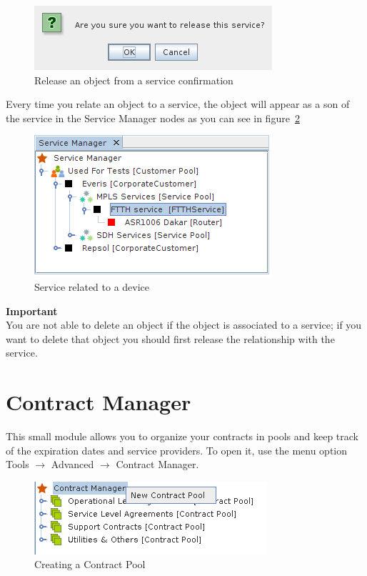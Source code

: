 \documentclass[a4paper]{article}
\begin{document}
	\begin{figure}[h!]
		\centering
		\includegraphics[width=0.5\linewidth]{img/sm_release_from_service_confrimation.png}
		\caption{Release an object from a service confirmation}
		\label{fig:sm_release_from_service_confirmation}
	\end{figure}
	
	Every time you relate an object to a service, the object will appear as a son of the service in the Service Manager nodes as you can see in figure~\ref{fig:sm_device_relate_to_service}
	\begin{figure}[h!]
		\centering
		\includegraphics[width=0.5\linewidth]{img/sm_device_relate_to_service.png}
		\caption{Service related to a device}
		\label{fig:sm_device_relate_to_service}
	\end{figure}
	\begin{framed} {\large \textbf{Important}}\\
		You are not able to delete an object if the object is associated to a service; if you want to delete that object you should first release the relationship with the service.
	\end{framed}
	
	
	\newpage
	\section{Contract Manager} \label{sec:contract_manager}
		This small module allows you to organize your contracts in pools and keep track of the expiration dates and service providers. To open it, use the menu option Tools $\rightarrow$ Advanced $\rightarrow$ Contract Manager.
		\begin{figure}[h!]
			\centering
			\includegraphics[width=0.5\linewidth]{img/contract_manager_new_contract_pool.png}
			\caption{Creating a Contract Pool}
			\label{fig:contract_manager_new_contract_pool}
		\end{figure}
		
\end{document}
